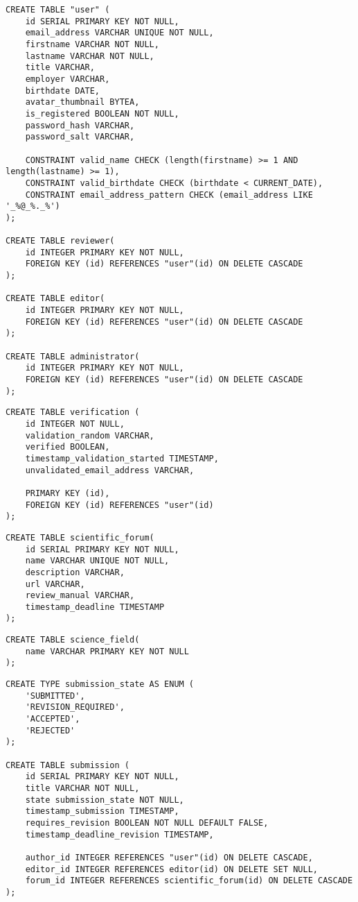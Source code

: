 \begin{lstlisting}[caption={DDL von Nutzern}]
CREATE TABLE "user" (
	id SERIAL PRIMARY KEY NOT NULL,
	email_address VARCHAR UNIQUE NOT NULL,
	firstname VARCHAR NOT NULL,
	lastname VARCHAR NOT NULL,
	title VARCHAR,
	employer VARCHAR,
	birthdate DATE,
	avatar_thumbnail BYTEA,
	is_registered BOOLEAN NOT NULL,
	password_hash VARCHAR,
	password_salt VARCHAR,

	CONSTRAINT valid_name CHECK (length(firstname) >= 1 AND length(lastname) >= 1),
	CONSTRAINT valid_birthdate CHECK (birthdate < CURRENT_DATE),
	CONSTRAINT email_address_pattern CHECK (email_address LIKE '_%@_%._%')
);

CREATE TABLE reviewer(
	id INTEGER PRIMARY KEY NOT NULL,
	FOREIGN KEY (id) REFERENCES "user"(id) ON DELETE CASCADE
);

CREATE TABLE editor(
	id INTEGER PRIMARY KEY NOT NULL,
	FOREIGN KEY (id) REFERENCES "user"(id) ON DELETE CASCADE
);

CREATE TABLE administrator(
	id INTEGER PRIMARY KEY NOT NULL,
	FOREIGN KEY (id) REFERENCES "user"(id) ON DELETE CASCADE
);
\end{lstlisting}

\begin{lstlisting}[caption={DDL von Verifizierung}]
CREATE TABLE verification (
	id INTEGER NOT NULL,
	validation_random VARCHAR,
	verified BOOLEAN,
	timestamp_validation_started TIMESTAMP,
	unvalidated_email_address VARCHAR,

	PRIMARY KEY (id),
	FOREIGN KEY (id) REFERENCES "user"(id)
);
\end{lstlisting}

\begin{lstlisting}[caption={DDL von wissenschaftlichen Foren}]
CREATE TABLE scientific_forum(
	id SERIAL PRIMARY KEY NOT NULL,
	name VARCHAR UNIQUE NOT NULL,
	description VARCHAR,
	url VARCHAR,
	review_manual VARCHAR,
	timestamp_deadline TIMESTAMP
);
\end{lstlisting}

\begin{lstlisting}[caption={DDL von Fachgebieten}]
CREATE TABLE science_field(
	name VARCHAR PRIMARY KEY NOT NULL
);
\end{lstlisting}
\begin{lstlisting}[caption={DDL von Einreichungen}]
CREATE TYPE submission_state AS ENUM (
	'SUBMITTED',
	'REVISION_REQUIRED',
	'ACCEPTED',
	'REJECTED'
);

CREATE TABLE submission (
	id SERIAL PRIMARY KEY NOT NULL,
	title VARCHAR NOT NULL,
	state submission_state NOT NULL,
	timestamp_submission TIMESTAMP,
	requires_revision BOOLEAN NOT NULL DEFAULT FALSE,
	timestamp_deadline_revision TIMESTAMP,

	author_id INTEGER REFERENCES "user"(id) ON DELETE CASCADE,
	editor_id INTEGER REFERENCES editor(id) ON DELETE SET NULL,
	forum_id INTEGER REFERENCES scientific_forum(id) ON DELETE CASCADE
);
\end{lstlisting}

